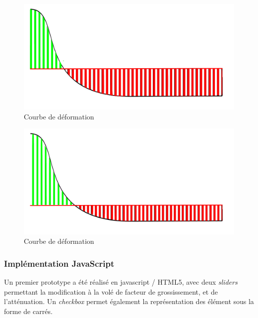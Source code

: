 \begin{minipage}[H]{.5\textwidth}
\begin{figure}[H]
  \centering
  \vspace{.4cm}
  \includegraphics[width=\textwidth]{../resources/illustrations/js_4}
  \caption{Courbe de déformation}
    \label{fig:js_4}
\end{figure}
\end{minipage}
\begin{minipage}[H]{.5\textwidth}
\begin{figure}[H]
  \centering
  \includegraphics[width=\textwidth]{../resources/illustrations/js_5}
  \vspace{.05cm}
  \caption{Courbe de déformation}
  \label{fig:js_5}
\end{figure}
\end{minipage}

\subsubsection{Implémentation JavaScript}

Un premier prototype a été réalisé en javascript / HTML5, avec deux \emph{sliders} permettant la modification à la volé de facteur de grossissement, et de l'atténuation. Un \emph{checkbox} permet également la représentation des élément sous la forme de carrés.

